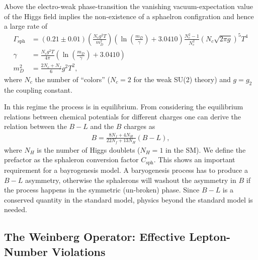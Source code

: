 \documentclass[13pt,a4paper,titlepage]{article}
\begin{document}
\newpage
\noindent
Above the electro-weak phase-transition the vanishing vacuum-expectation value of the Higgs field implies the non-existence of a sphaelron configration and hence a large rate of \cite{sphaleron_rate_symmetric_phase_Moore_2011}
\begin{align}
    \Gamma_{\mathrm{sph}} &= (0.21 \pm 0.01) \left(\frac{N_c g^2 T}{m_D^2} \right) \left(\ln \left(\frac{m_D}{\gamma} \right) + 3.0410 \right) \frac{N_c^2 - 1}{N_c^2} (N_c \sqrt{2 \pi g})^5 T^4 \\
    \gamma &= \frac{N_c g^2 T}{4 \pi} \left(\ln \left(\frac{m_D}{\gamma}\right) + 3.0410 \right) \\
    m_D^2 &= \frac{2N_c + N_f}{6} g^2 T^2,
\end{align}
where $N_c$ the number of ``colors'' ($N_c = 2$ for the weak SU(2) theory) and $g = g_2$ the coupling constant.

\noindent
In this regime the process is in equilibrium. From considering the
equilibrium relations between chemical potentials for different charges one
can derive the relation between the $B - L$ and the $B$ charges as \cite[sec 2.5]{Leptogenesis_review_doi:10.1146/annurev.nucl.55.090704.151558}
\begin{align}
    \label{eq:sphaleron_conversion}
    B = \frac{8 N_f + 4 N_H}{22 N_f + 13 N_H} (B - L),
\end{align}
where $N_H$ is the number of Higgs doublets ($N_H = 1$ in the SM). We define the prefactor as the sphaleron conversion factor $C_\mathrm{sph}$.
This shows an important requirement for a bayrogenesis model.
A baryogenesis process has to produce a $B - L$ asymmetry, otherwise the sphalerons
will washout the asymmetry in $B$ if the process happens in the symmetric (un-broken) phase. Since $B - L$ is a conserved quantity in the standard model, physics beyond the standard model is needed.

\subsection{The Weinberg Operator: Effective Lepton-Number Violations}
\label{sec:lepton_number_violations}
\end{document}
